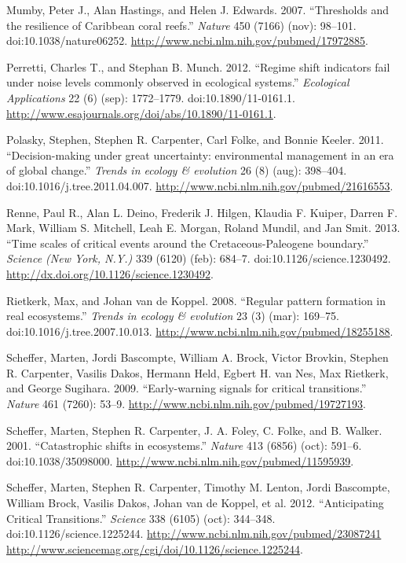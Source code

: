 \documentclass[author-year, review]{elsarticle} %
\begin{document}
Mumby, Peter J., Alan Hastings, and Helen J. Edwards. 2007. ``Thresholds
and the resilience of Caribbean coral reefs.'' \emph{Nature} 450 (7166)
(nov): 98--101. doi:10.1038/nature06252.
\url{http://www.ncbi.nlm.nih.gov/pubmed/17972885}.

Perretti, Charles T., and Stephan B. Munch. 2012. ``Regime shift
indicators fail under noise levels commonly observed in ecological
systems.'' \emph{Ecological Applications} 22 (6) (sep): 1772--1779.
doi:10.1890/11-0161.1.
\url{http://www.esajournals.org/doi/abs/10.1890/11-0161.1}.

Polasky, Stephen, Stephen R. Carpenter, Carl Folke, and Bonnie Keeler.
2011. ``Decision-making under great uncertainty: environmental
management in an era of global change.'' \emph{Trends in ecology \&
evolution} 26 (8) (aug): 398--404. doi:10.1016/j.tree.2011.04.007.
\url{http://www.ncbi.nlm.nih.gov/pubmed/21616553}.

Renne, Paul R., Alan L. Deino, Frederik J. Hilgen, Klaudia F. Kuiper,
Darren F. Mark, William S. Mitchell, Leah E. Morgan, Roland Mundil, and
Jan Smit. 2013. ``Time scales of critical events around the
Cretaceous-Paleogene boundary.'' \emph{Science (New York, N.Y.)} 339
(6120) (feb): 684--7. doi:10.1126/science.1230492.
\url{http://dx.doi.org/10.1126/science.1230492}.

Rietkerk, Max, and Johan van de Koppel. 2008. ``Regular pattern
formation in real ecosystems.'' \emph{Trends in ecology \& evolution} 23
(3) (mar): 169--75. doi:10.1016/j.tree.2007.10.013.
\url{http://www.ncbi.nlm.nih.gov/pubmed/18255188}.

Scheffer, Marten, Jordi Bascompte, William A. Brock, Victor Brovkin,
Stephen R. Carpenter, Vasilis Dakos, Hermann Held, Egbert H. van Nes,
Max Rietkerk, and George Sugihara. 2009. ``Early-warning signals for
critical transitions.'' \emph{Nature} 461 (7260): 53--9.
\url{http://www.ncbi.nlm.nih.gov/pubmed/19727193}.

Scheffer, Marten, Stephen R. Carpenter, J. A. Foley, C. Folke, and B.
Walker. 2001. ``Catastrophic shifts in ecosystems.'' \emph{Nature} 413
(6856) (oct): 591--6. doi:10.1038/35098000.
\url{http://www.ncbi.nlm.nih.gov/pubmed/11595939}.

Scheffer, Marten, Stephen R. Carpenter, Timothy M. Lenton, Jordi
Bascompte, William Brock, Vasilis Dakos, Johan van de Koppel, et al.
2012. ``Anticipating Critical Transitions.'' \emph{Science} 338 (6105)
(oct): 344--348. doi:10.1126/science.1225244.
\href{http://www.ncbi.nlm.nih.gov/pubmed/23087241 http://www.sciencemag.org/cgi/doi/10.1126/science.1225244}{http://www.ncbi.nlm.nih.gov/pubmed/23087241
http://www.sciencemag.org/cgi/doi/10.1126/science.1225244}.
\end{document}
